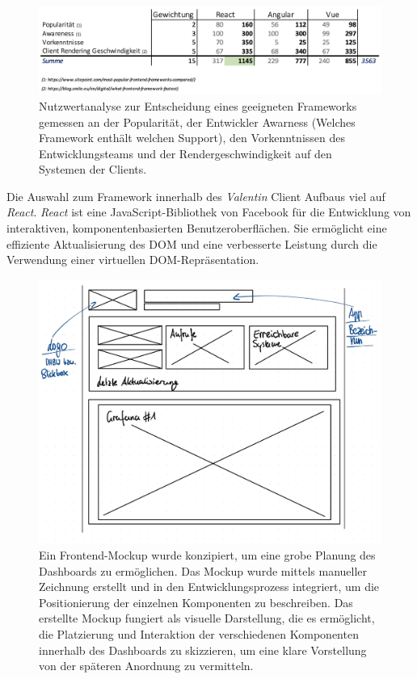 \documentclass[
]{article}
\begin{document}
\begin{figure}[H]
  \centering
  \includegraphics[width=1\textwidth]{./resources/techevaluationfe.png}
  \caption{Nutzwertanalyse zur Entscheidung eines geeigneten Frameworks gemessen an der Popularität, der Entwickler Awarness (Welches Framework enthält welchen Support), den Vorkenntnissen des Entwicklungsteams und der Rendergeschwindigkeit auf den Systemen der Clients.}
  \label{fig:deine_label}
\end{figure}

Die Auswahl zum Framework innerhalb des \textit{Valentin} Client Aufbaus viel auf \textit{React}. \textit{React} ist eine JavaScript-Bibliothek von Facebook für die Entwicklung von interaktiven, komponentenbasierten Benutzeroberflächen. Sie ermöglicht eine effiziente Aktualisierung des DOM und eine verbesserte Leistung durch die Verwendung einer virtuellen DOM-Repräsentation.

\begin{figure}[H]
	\centering
	\includegraphics[width=160mm]{resources/femockup-1.jpg}
	\caption{Ein Frontend-Mockup wurde konzipiert, um eine grobe Planung des Dashboards zu ermöglichen. Das Mockup wurde mittels manueller Zeichnung erstellt und in den Entwicklungsprozess integriert, um die Positionierung der einzelnen Komponenten zu beschreiben. Das erstellte Mockup fungiert als visuelle Darstellung, die es ermöglicht, die Platzierung und Interaktion der verschiedenen Komponenten innerhalb des Dashboards zu skizzieren, um eine klare Vorstellung von der späteren Anordnung zu vermitteln.}
	\label{fig:FrontendMockup}
\end{figure}  
\end{document}
